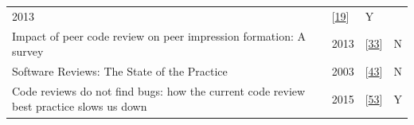 \documentclass[]{book}
\begin{document}
\begin{longtable}[]{@{}llll@{}}
\begin{minipage}[t]{0.04\columnwidth}
2013\strut
\end{minipage} & \begin{minipage}[t]{0.16\columnwidth}\raggedright\strut
{[}\protect\hyperlink{ref-baysal2013influence}{19}{]}\strut
\end{minipage} & \begin{minipage}[t]{0.12\columnwidth}\raggedright\strut
Y\strut
\end{minipage}\tabularnewline
\begin{minipage}[t]{0.56\columnwidth}\raggedright\strut
Impact of peer code review on peer impression formation: A survey\strut
\end{minipage} & \begin{minipage}[t]{0.04\columnwidth}\raggedright\strut
2013\strut
\end{minipage} & \begin{minipage}[t]{0.16\columnwidth}\raggedright\strut
{[}\protect\hyperlink{ref-bosu2013impact}{33}{]}\strut
\end{minipage} & \begin{minipage}[t]{0.12\columnwidth}\raggedright\strut
N\strut
\end{minipage}\tabularnewline
\begin{minipage}[t]{0.56\columnwidth}\raggedright\strut
Software Reviews: The State of the Practice\strut
\end{minipage} & \begin{minipage}[t]{0.04\columnwidth}\raggedright\strut
2003\strut
\end{minipage} & \begin{minipage}[t]{0.16\columnwidth}\raggedright\strut
{[}\protect\hyperlink{ref-ciolkowski2003software}{43}{]}\strut
\end{minipage} & \begin{minipage}[t]{0.12\columnwidth}\raggedright\strut
N\strut
\end{minipage}\tabularnewline
\begin{minipage}[t]{0.56\columnwidth}\raggedright\strut
Code reviews do not find bugs: how the current code review best practice
slows us down\strut
\end{minipage} & \begin{minipage}[t]{0.04\columnwidth}\raggedright\strut
2015\strut
\end{minipage} & \begin{minipage}[t]{0.16\columnwidth}\raggedright\strut
{[}\protect\hyperlink{ref-czerwonka2015code}{53}{]}\strut
\end{minipage} & \begin{minipage}[t]{0.12\columnwidth}\raggedright\strut
Y\strut
\end{minipage}\tabularnewline
\bottomrule
\end{longtable}
\end{document}

